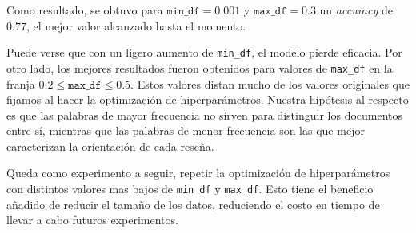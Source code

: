 Como resultado, se obtuvo para $\mathtt{min\_df}=0.001$ y
$\mathtt{max\_df}=0.3$ un \textit{accuracy} de $0.77$, el mejor valor alcanzado
hasta el momento.

Puede verse que con un ligero aumento de \texttt{min\_df}, el modelo pierde
eficacia. Por otro lado, los mejores resultados fueron obtenidos para valores
de \texttt{max\_df} en la franja $0.2 \leq \mathtt{max\_df} \leq 0.5$. Estos
valores distan mucho de los valores originales que fijamos al hacer la
optimización de hiperparámetros. Nuestra hipótesis al respecto es que las
palabras de mayor frecuencia no sirven para distinguir los documentos entre sí,
mientras que las palabras de menor frecuencia son las que mejor caracterizan la
orientación de cada reseña.

Queda como experimento a seguir, repetir la optimización de hiperparámetros con
distintos valores mas bajos de \texttt{min\_df} y \texttt{max\_df}. Esto tiene
el beneficio añadido de reducir el tamaño de los datos, reduciendo el costo en
tiempo de llevar a cabo futuros experimentos.
